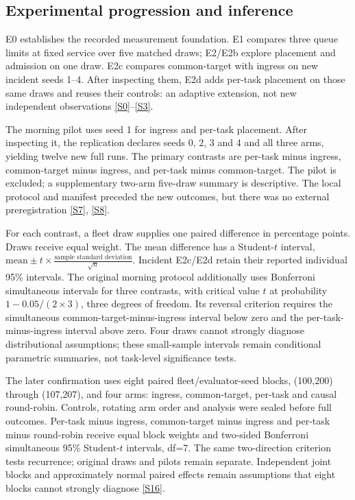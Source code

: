 \documentclass[11pt,a4paper]{article}
\begin{document}
\subsection{Experimental progression and inference}\label{sec:2.6}

E0 establishes the recorded measurement foundation. E1 compares three queue limits at fixed service over five matched draws; E2/E2b explore placement and admission on one draw. E2c compares common-target with ingress on new incident seeds 1--4. After inspecting them, E2d adds per-task placement on those same draws and reuses their controls: an adaptive extension, not new independent observations \hyperref[source-s0]{[S0]}--\hyperref[source-s3]{[S3]}.

The morning pilot uses seed 1 for ingress and per-task placement. After inspecting it, the replication declares seeds 0, 2, 3 and 4 and all three arms, yielding twelve new full runs. The primary contrasts are per-task minus ingress, common-target minus ingress, and per-task minus common-target. The pilot is excluded; a supplementary two-arm five-draw summary is descriptive. The local protocol and manifest preceded the new outcomes, but there was no external preregistration \hyperref[source-s7]{[S7]}, \hyperref[source-s8]{[S8]}.

For each contrast, a fleet draw supplies one paired difference in percentage points. Draws receive equal weight. The mean difference has a Student-$t$ interval, $\text{mean}\pm t\times\frac{\text{sample standard deviation}}{\sqrt{n}}$. Incident E2c/E2d retain their reported individual 95\% intervals. The original morning protocol additionally uses Bonferroni simultaneous intervals for three contrasts, with critical value $t$ at probability $1-0.05/(2\times 3)$, three degrees of freedom. Its reversal criterion requires the simultaneous common-target-minus-ingress interval below zero and the per-task-minus-ingress interval above zero. Four draws cannot strongly diagnose distributional assumptions; these small-sample intervals remain conditional parametric summaries, not task-level significance tests.

The later confirmation uses eight paired fleet/evaluator-seed blocks, (100,200) through (107,207), and four arms: ingress, common-target, per-task and causal round-robin. Controls, rotating arm order and analysis were sealed before full outcomes. Per-task minus ingress, common-target minus ingress and per-task minus round-robin receive equal block weights and two-sided Bonferroni simultaneous 95\% Student-$t$ intervals, df=7. The same two-direction criterion tests recurrence; original draws and pilots remain separate. Independent joint blocks and approximately normal paired effects remain assumptions that eight blocks cannot strongly diagnose \hyperref[source-s16]{[S16]}.
\end{document}
